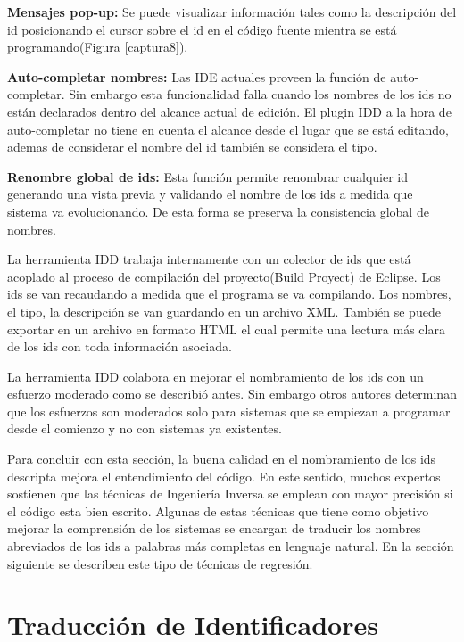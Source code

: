 \documentclass[a4paper,12pt]{report}
\begin{document}
\textbf{Mensajes pop-up:} Se puede visualizar información tales como la descripción del id posicionando el cursor sobre el id en el código fuente mientra se está programando(Figura \ref{captura8}).

\textbf{Auto-completar nombres:} Las IDE actuales proveen la función de auto-completar. Sin embargo esta funcionalidad falla cuando los nombres de los ids no están declarados dentro del alcance actual de edición. El plugin IDD a la hora de auto-completar no tiene en cuenta el alcance desde el lugar que se está editando, ademas de considerar el nombre del id también se considera el tipo.


\textbf{Renombre global de ids:} Esta función permite renombrar cualquier id generando una vista previa y validando el nombre de los ids a medida que sistema va evolucionando. De esta forma se preserva la consistencia global de nombres.

La herramienta IDD trabaja internamente con un colector de ids que está acoplado al proceso de compilación del proyecto(Build Proyect) de Eclipse. Los ids se van recaudando a medida que el programa se va compilando. Los nombres, el tipo, la descripción se van guardando en un archivo XML. También se puede exportar en un archivo en formato HTML el cual permite una lectura más clara de los ids con toda información asociada\cite{DFPM05}.



La herramienta IDD colabora en mejorar el nombramiento de los ids con un esfuerzo moderado como se describió antes. Sin embargo otros autores\cite{LFBEX07,DLHD06} determinan que los esfuerzos son moderados solo para sistemas que se empiezan a programar desde el comienzo y no con sistemas ya existentes.

Para concluir con esta sección, la buena calidad en el nombramiento de los ids descripta mejora el entendimiento del código. En este sentido, muchos expertos sostienen que las técnicas de Ingeniería Inversa se emplean con mayor precisión si el código esta bien escrito. Algunas de estas técnicas que tiene como objetivo mejorar la comprensión de los sistemas se encargan de traducir los nombres abreviados de los ids a palabras más completas en lenguaje natural. En la sección siguiente se describen este tipo de técnicas de regresión.

\pagebreak
\section{Traducción de Identificadores}
\end{document}

